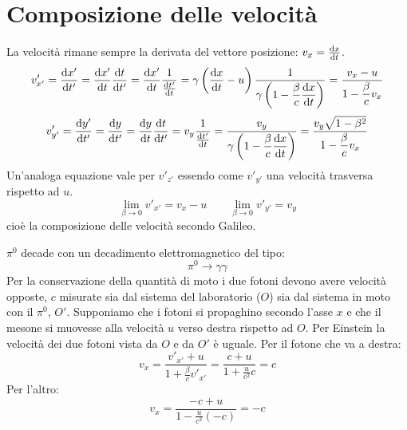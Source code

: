 \section{Composizione delle velocità}
La velocità rimane sempre la derivata del vettore posizione: $v_x=\frac{\mathrm{d} x}{\mathrm{d} t}$.
\begin{equation}
v'_{x'}=\frac{\mathrm{d} x'}{\mathrm{d} t'}=\frac{\mathrm{d} x'}{\mathrm{d} t}\frac{\mathrm{d} t}{\mathrm{d} t'}=\frac{\mathrm{d} x'}{\mathrm{d} t}\dfrac{1}{\frac{\mathrm{d} t'}{\mathrm{d} t}}=\gamma\left(\frac{\mathrm{d} x}{\mathrm{d} t}-u\right)\dfrac{1}{\gamma\left(1-\dfrac{\beta}{c}\dfrac{\mathrm{d} x}{\mathrm{d} t}\right)}=\dfrac{v_x-u}{1-\dfrac{\beta}{c}v_x}
\end{equation}
\begin{equation}
v'_{y'}=\frac{\mathrm{d} y'}{\mathrm{d} t'}=\frac{\mathrm{d} y}{\mathrm{d} t'}=\frac{\mathrm{d} y}{\mathrm{d} t}\frac{\mathrm{d} t}{\mathrm{d} t'}=v_y\frac{1}{\frac{\mathrm{d} t'}{\mathrm{d} t}}=\dfrac{v_y}{\gamma\left(1-\dfrac{\beta}{c}\dfrac{\mathrm{d} x}{\mathrm{d} t}\right)}=\dfrac{v_y\sqrt{1-\beta^2}}{1-\dfrac{\beta}{c}v_x}
\end{equation}
Un'analoga equazione vale per $v'_{z'}$ essendo come $v'_{y'}$ una velocità trasversa rispetto ad $u$.
\begin{equation*}\lim_{\beta\rightarrow 0}v'_{x'}=v_x-u\qquad \lim_{\beta\rightarrow 0} v'_{y'}=v_y\end{equation*}
cioè la composizione delle velocità secondo Galileo.

\begin{Es}[decadimento $\pi^0$]
$\pi^0$ decade con un decadimento elettromagnetico del tipo:
\begin{equation*}\pi^0\rightarrow \gamma\gamma\end{equation*}
Per la conservazione della quantità di moto i due fotoni devono avere velocità opposte, $c$ misurate sia dal sistema del laboratorio ($O$) sia dal sistema in moto con il $\pi^0$, $O'$. Supponiamo che i fotoni si propaghino secondo l'asse $x$ e che il mesone si muovesse alla velocità $u$ verso destra rispetto ad $O$. Per Einstein la velocità dei due fotoni vista da $O$ e da $O'$ è uguale.
Per il fotone che va a destra:
\begin{equation*}v_x=\frac{v'_{x'}+u}{1+\frac{\beta}{c}v'_{x'}}=\frac{c+u}{1+\frac{u}{c^2}c}=c\end{equation*}
Per l'altro:
\begin{equation*}v_x=\frac{-c+u}{1-\frac{u}{c^2}(-c)}=-c\end{equation*}
\end{Es}
